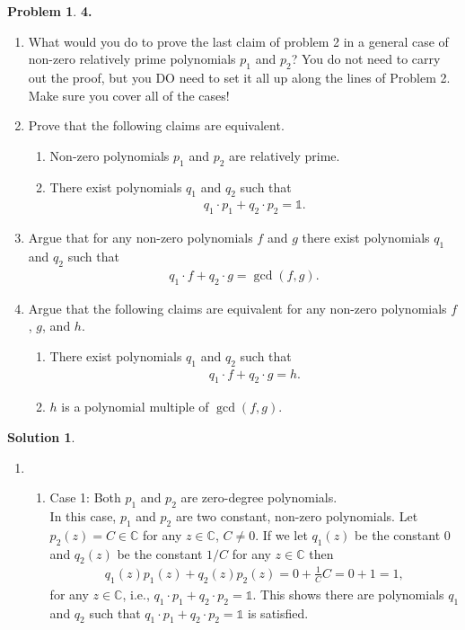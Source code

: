 \documentclass{book}
\theoremstyle{definition}
\newtheorem*{prob*}{Problem}
\newtheorem*{sln*}{Solution}
\begin{document}
\begin{prob*}\textbf{4.}\\
	\begin{enumerate}
		\item What would you do to prove the last claim of problem 2 in a general case of non-zero relatively prime polynomials $p_1$ and $p_2$? You do not need to carry out the proof, but you DO need to set it all up along the lines of Problem 2. Make sure you cover all of the cases!
		\item Prove that the following claims are equivalent.
		\begin{enumerate}
			\item Non-zero polynomials $p_1$ and $p_2$ are relatively prime.
			\item There exist polynomials $q_1$ and $q_2$ such that
			\begin{align*}
			q_1 \cdot p_1 +q_2 \cdot p_2 = \mathbb{1}.
			\end{align*}
		\end{enumerate}
	\item Argue that for any non-zero polynomials $f$ and $g$ there exist polynomials $q_1$ and $q_2$ such that
	\begin{align*}
	q_1 \cdot f + q_2 \cdot g = \gcd(f,g).
	\end{align*}
	\item Argue that the following claims are equivalent for any non-zero polynomials $f$, $g$, and $h$.
	\begin{enumerate}
		\item There exist polynomials $q_1$ and $q_2$ such that
		\begin{align*}
		q_1 \cdot f + q_2 \cdot g= h.
		\end{align*}
		\item $h$ is a polynomial multiple of $\gcd(f,g)$. 
	\end{enumerate}
	\end{enumerate}




\begin{sln*}
	$\,$
	\begin{enumerate}
	\item 
	\begin{enumerate}
		\item Case 1: Both $p_1$ and $p_2$ are zero-degree polynomials.\\
		
		In this case, $p_1$ and $p_2$ are two constant, non-zero polynomials. Let $p_2(z) = C \in \mathbb{C}$ for any $z\in \mathbb{C}$, $C\neq 0$. If we let $q_1(z)$ be the constant $0$ and $q_2(z)$ be the constant $1/C$ for any $z\in \mathbb{C}$ then
		\begin{align*}
		q_1(z) p_1(z) + q_2(z)p_2(z) = 0 + \frac{1}{C}C = 0 + 1 = 1,
		\end{align*}
		for any $z\in \mathbb{C}$, i.e., $q_1\cdot p_1 + q_2 \cdot p_2 = \mathbb{1}$. This shows there are polynomials $q_1$ and $q_2$ such that $q_1 \cdot p_1 + q_2 \cdot p_2 = \mathbb{1}$ is satisfied.\\
		

\end{enumerate}
\end{enumerate}
\end{sln*}
\end{prob*}
\end{document}
